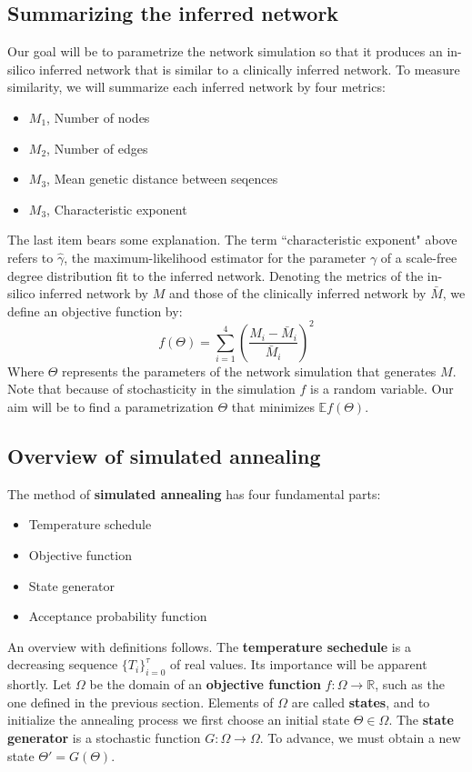 \documentclass[12pt]{scrartcl}
\newcommand{\E}{\mathbb{E}}
\newcommand{\R}{\mathbb{R}}
\begin{document}
\subsection{Summarizing the inferred network}
Our goal will be to parametrize the network simulation so that it produces an in-silico inferred network that is similar to a clinically inferred network. To measure similarity, we will summarize each inferred network by four metrics:
\begin{itemize}
\item $M_1$, Number of nodes
\item $M_2$, Number of edges
\item $M_3$, Mean genetic distance between seqences
\item $M_3$, Characteristic exponent
\end{itemize}
The last item bears some explanation. The term ``characteristic exponent" above refers to $\hat{\gamma}$, the maximum-likelihood estimator for the parameter $\gamma$ of a scale-free degree distribution fit to the inferred network. Denoting the metrics of the in-silico inferred network by $M$ and those of the clinically inferred network by $\bar{M}$, we define an objective function by:
\[f(\Theta) = \sum_{i=1}^4 (\frac{M_i - \bar{M}_i}{\bar{M}_i})^2\]
Where $\Theta$ represents the parameters of the network simulation that generates $M$. Note that because of stochasticity in the simulation $f$ is a random variable. Our aim will be to find a parametrization $\Theta$ that minimizes $\E f(\Theta)$. 

\subsection{Overview of simulated annealing}
The method of \textbf{simulated annealing} has four fundamental parts:
\begin{itemize}
\item Temperature schedule
\item Objective function
\item State generator
\item Acceptance probability function
\end{itemize}
An overview with definitions follows. The \textbf{temperature sechedule} is a decreasing sequence $\{T_i\}_{i=0}^\tau$ of real values. Its importance will be apparent shortly. Let $\Omega$ be the domain of an \textbf{objective function} $f:\Omega \rightarrow \R$, such as the one defined in the previous section. Elements of $\Omega$ are called \textbf{states}, and to initialize the annealing process we first choose an initial state $\Theta \in \Omega$. The \textbf{state generator} is a stochastic function $G:\Omega \rightarrow \Omega$. To advance, we must obtain a new state $\Theta' = G(\Theta)$. 
\end{document}
